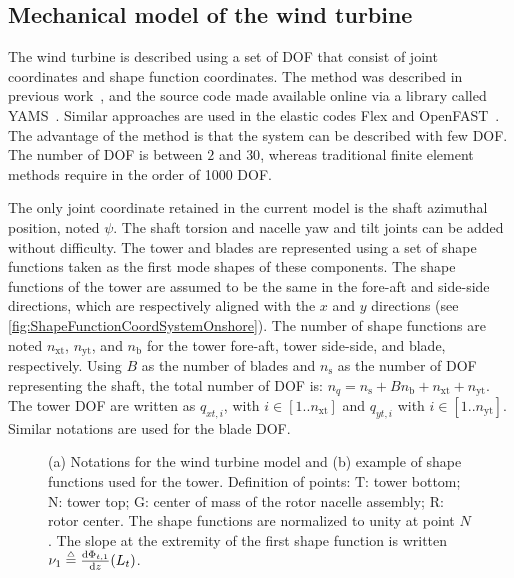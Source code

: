 \documentclass[wes, manuscript]{copernicus}
\begin{document}
\subsection{Mechanical model of the wind turbine}
\label{sec:MechModel}
The wind turbine is described using a set of DOF that consist of joint coordinates and shape function coordinates. The method was described in previous work~\citep{branlard:2019flex}, and the source code made available online via a library called YAMS~\citep{branlard:YAMS}. Similar approaches are used in the elastic codes Flex and OpenFAST~\citep{openfast}. The advantage of the method is that the system can be described with few DOF. The number of DOF is between $2$ and $30$, whereas traditional finite element methods require in the order of 1000 DOF.

The only joint coordinate retained in the current model is the shaft azimuthal position, noted $\psi$. 
The shaft torsion and nacelle yaw and tilt joints can be added without difficulty.
The tower and blades are represented using a set of shape functions taken as the first mode shapes of these components.
The shape functions of the tower are assumed to be the same in the fore-aft and side-side directions, which are respectively aligned with the $x$ and $y$ directions (see \autoref{fig:ShapeFunctionCoordSystemOnshore}).
The number of shape functions are noted $n_\text{xt}$, $n_\text{yt}$, and $n_\text{b}$ for the tower fore-aft, tower side-side, and blade, respectively. Using $B$ as the number of blades and $n_\text{s}$ as the number of DOF representing the shaft, the total number of DOF is: $n_q = n_\text{s} + B n_\text{b} + n_\text{xt}+n_\text{yt}$. The tower DOF are written as $q_{xt,i}$, with $i\in[1..n_\text{xt}]$ and $q_{yt,i}$ with $i\in[1..n_\text{yt}]$. Similar notations are used for the blade DOF.
%
\begin{figure}[!htb]%
 \centering%
 \def\svgwidth{0.7\columnwidth}%
 \caption{(a) Notations for the wind turbine model and (b) example of shape functions used for the tower. Definition of points: $\mathrm{T}$: tower bottom; $\mathrm{N}$: tower top; $\mathrm{G}$: center of mass of the rotor nacelle assembly; $\mathrm{R}$: rotor center. The shape functions are normalized to unity at point $N$. The slope at the extremity of the first shape function is written $\nu_1\stackrel{\mathsmaller{\mathsmaller{\mathsmaller{\triangle}}}}{=}\frac{\mathrm{d}\Phi_{t,1}}{\mathrm{d} z}(L_t)$. }\label{fig:ShapeFunctionCoordSystemOnshore}%
 \end{figure}%
%
\end{document}
